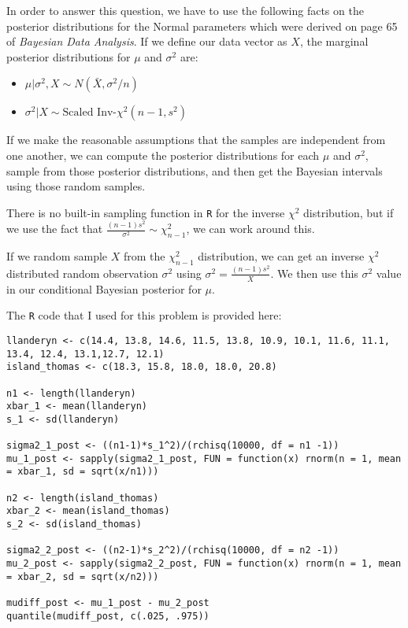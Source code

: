 \documentclass[12pt,a4paper]{article}
\begin{document}
In order to answer this question, we have to use the following facts on the posterior distributions for the Normal parameters which were derived on page 65 of \textit{Bayesian Data Analysis}.
If we define our data vector as $X$, the marginal posterior distributions for $\mu$ and $\sigma^2$ are:

\begin{itemize}
	\item $\mu | \sigma^2, X \sim N(\bar{X}, \sigma^2/n)$
	\item $\sigma^2 | X \sim \text{Scaled Inv-}\chi^2 (n - 1, s^2)$
\end{itemize}

If we make the reasonable assumptions that the samples are independent from one another, we can compute the posterior distributions for each $\mu$ and $\sigma^2$, sample from those posterior distributions, and then get the Bayesian intervals using those random samples.

There is no built-in sampling function in \texttt{R} for the inverse $\chi^2$ distribution, but if we use the fact that $\frac{(n-1)s^2}{\sigma^2} \sim \chi^2_{n-1}$, we can work around this.

If we random sample $X$ from the $\chi^2_{n-1}$ distribution, we can get an inverse $\chi^2$ distributed random observation $\sigma^2$ using $\sigma^2 = \frac{(n-1)s^2}{X}$.
We then use this $\sigma^2$ value in our conditional Bayesian posterior for $\mu$.

The \texttt{R} code that I used for this problem is provided here:

\begin{lstlisting}
llanderyn <- c(14.4, 13.8, 14.6, 11.5, 13.8, 10.9, 10.1, 11.6, 11.1, 13.4, 12.4, 13.1,12.7, 12.1)
island_thomas <- c(18.3, 15.8, 18.0, 18.0, 20.8)

n1 <- length(llanderyn)
xbar_1 <- mean(llanderyn)
s_1 <- sd(llanderyn)

sigma2_1_post <- ((n1-1)*s_1^2)/(rchisq(10000, df = n1 -1))
mu_1_post <- sapply(sigma2_1_post, FUN = function(x) rnorm(n = 1, mean = xbar_1, sd = sqrt(x/n1)))

n2 <- length(island_thomas)
xbar_2 <- mean(island_thomas)
s_2 <- sd(island_thomas)

sigma2_2_post <- ((n2-1)*s_2^2)/(rchisq(10000, df = n2 -1))
mu_2_post <- sapply(sigma2_2_post, FUN = function(x) rnorm(n = 1, mean = xbar_2, sd = sqrt(x/n2)))

mudiff_post <- mu_1_post - mu_2_post
quantile(mudiff_post, c(.025, .975))
\end{lstlisting}
\end{document}
